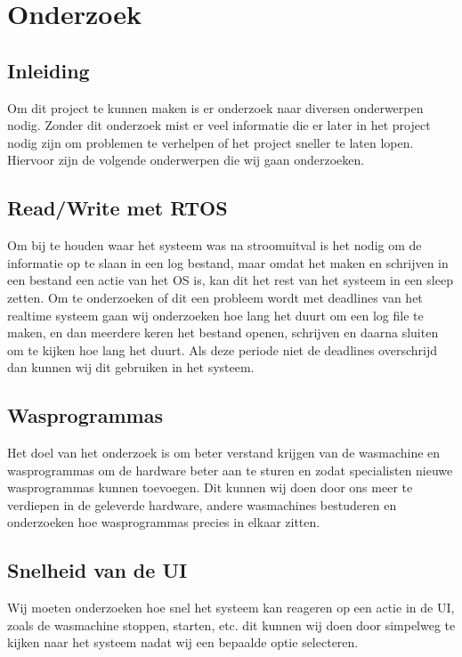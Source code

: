\chapter{Onderzoek}
\section{Inleiding}
Om dit project te kunnen maken is er onderzoek naar diversen onderwerpen nodig. Zonder dit onderzoek mist er veel informatie die er later in het project nodig zijn om problemen te verhelpen of het project sneller te laten lopen.
Hiervoor zijn de volgende onderwerpen die wij gaan onderzoeken.

\section{Read/Write met RTOS}
Om bij te houden waar het systeem was na stroomuitval is het nodig om de informatie op te slaan in een log bestand, maar omdat het maken en schrijven in een 
bestand een actie van het OS is, kan dit het rest van het systeem in een sleep zetten. Om te onderzoeken of dit een probleem wordt met deadlines van het realtime systeem gaan wij 
onderzoeken hoe lang het duurt om een log file te maken, en dan meerdere keren het bestand openen, schrijven en daarna sluiten om te kijken hoe lang het duurt. Als deze periode niet de 
deadlines overschrijd dan kunnen wij dit gebruiken in het systeem.

\section{Wasprogrammas}
Het doel van het onderzoek is om beter verstand krijgen van de wasmachine en wasprogrammas om de hardware beter aan te sturen en zodat specialisten nieuwe wasprogrammas kunnen toevoegen.
Dit kunnen wij doen door ons meer te verdiepen in de geleverde hardware, andere wasmachines bestuderen en onderzoeken hoe wasprogrammas precies in elkaar zitten.

\section{Snelheid van de UI}
Wij moeten onderzoeken hoe snel het systeem kan reageren op een actie in de UI, zoals de wasmachine stoppen, starten, etc. dit kunnen wij doen door simpelweg te 
kijken naar het systeem nadat wij een bepaalde optie selecteren. 

